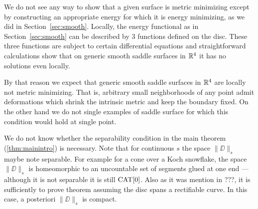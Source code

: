 \documentclass{article}
\begin{document}
We do not see any way to show that a given surface is metric minimizing except by constructing an appropriate energy for which it is energy minimizing, as we did in Section~\ref{sec:smooth}.
Locally, the energy functional as in Section~\ref{sec:smooth} can be described by 3 functions defined on the disc.
These three functions are subject to certain differential equations and 
straightforward calculations show that on generic smooth saddle surfaces in $\mathbb{R}^4$ 
it has no solutions even locally.

By that reason we expect that generic smooth saddle surfaces in $\mathbb{R}^4$ are locally not metric minimizing. 
That is, arbitrary small neighborhoods of any point admit deformations which shrink 
the intrinsic metric and keep the boundary fixed.
On the other hand we do not single examples of saddle surface for which this condition would hold at single point.

We do not know whether the separability condition in the main theorem (\ref{thm:mainintro}) is necessary.
Note that for continuous $s$ the space $\|\DD\|_s$ maybe note separable.
For example for a cone over a Koch snowflake, the space $\|\DD\|_s$ is homeomorphic to an uncountable set of segments glued at one end --- although it is not separable it is still $\mathop{\rm CAT}\nolimits[0]$.
Also as it was mention in ???, 
it is sufficiently to prove theorem assuming the disc spans a rectifiable curve.
In this case, a posteriori $\|\DD\|_s$ is compact.
\end{document}
